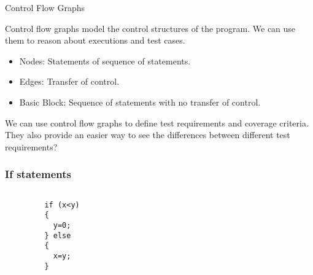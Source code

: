\documentclass[handout]{beamer}
\begin{document}
 \begin{frame}{Control Flow Graphs}

Control flow graphs model the control structures of the program. We
can use them to reason about executions and test cases.
\begin{itemize}
\item Nodes: Statements of sequence of statements.
\item Edges: Transfer of control.
\item Basic Block: Sequence of statements with no transfer of control.
\end{itemize}

We can use control flow graphs to define test requirements and
coverage criteria. They also provide an easier way to see the
differences between different test requirements? 
\end{frame}


\begin{frame}[fragile]%
\frametitle{If statements}
\begin{columns}
\begin{column}{0.5\textwidth}
\begin{lstlisting}
         if (x<y) 
         { 
           y=0; 
         } else
         {
           x=y;
         }
\end{lstlisting}
\end{column}
\begin{column}{0.5\textwidth}
\end{column}
\end{columns}
\end{frame}
\end{document}

